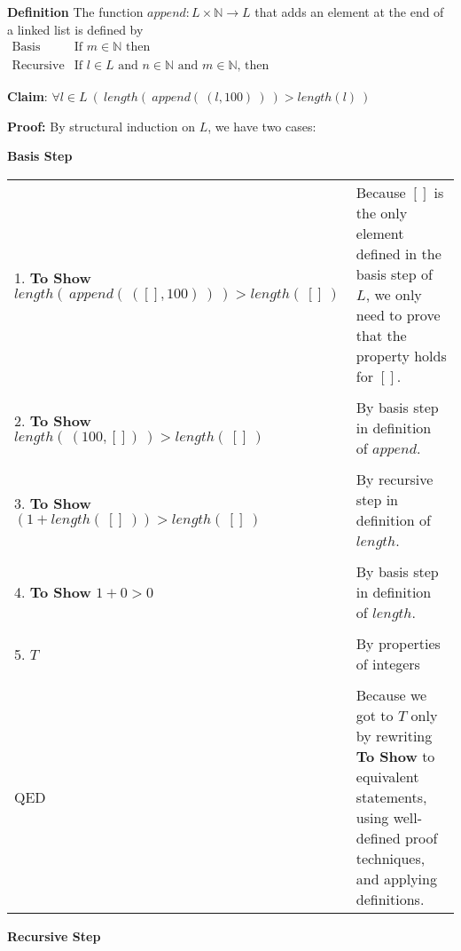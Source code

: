 \documentclass[12pt, oneside]{article}
\begin{document}
{\bf Definition} The function $append : L \times \mathbb{N} \to L$ that 
adds an element at the end of a linked list is defined by
\[
\begin{array}{llll}
\textrm{Basis Step:} & \textrm{If } m \in \mathbb{N}\textrm{ then } & \phantom{append(~([], m)~)} & \phantom{= (m, []) }\\
\textrm{Recursive Step:} & \textrm{If } l \in L\textrm{ and }n \in \mathbb{N}\textrm{ and }m \in \mathbb{N}\textrm{, then  } & \phantom{append(~(~(n, l), m~)~) } &\phantom{= (n, append(~(l, m)~)~)}
\end{array}
\] \vspace{50pt}
\newpage


{\bf Claim}: $\forall l \in L ~ (~length(~append(~(l, 100)~)~) > length(l)~)$

{\bf Proof:} By structural induction on $L$, we have two cases:

{\bf Basis Step}

    \begin{tabular}{l p{3.5in}}
     1. \textbf{To Show} $length(~append(~([], 100)~)~) > length(~[]~)$
    & Because $[]$ is the only element defined in the basis step of $L$, 
    we only need to prove that the property holds for $[]$.\\
    &  \\
     2. \textbf{To Show} $length(~(100,[])~) > length(~[]~)$
    &  By basis step in definition of $append$.\\
    &  \\
     3. \textbf{To Show} $(1 +length(~[]~)) > length(~[]~)$
    &  By recursive step in definition of $length$.\\
    &  \\    
     4. \textbf{To Show} $1+0 > 0$
    &  By basis step in definition of $length$.\\
    &  \\    
    5. $T$
    & By properties of integers \\
    &  \\    
    QED & Because we got to $T$ only by rewriting \textbf{To Show} to equivalent statements, using well-defined proof techniques, and applying definitions. \\
    \end{tabular}

{\bf Recursive Step}
\end{document}
